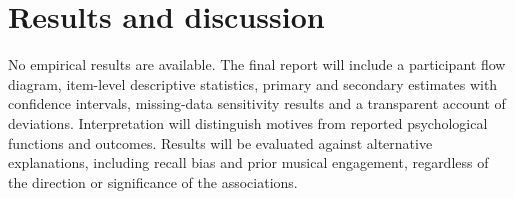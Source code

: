 \documentclass[11pt,a4paper]{article}
\begin{document}
\section{Results and discussion}
No empirical results are available. The final report will include a participant flow diagram, item-level descriptive statistics, primary and secondary estimates with confidence intervals, missing-data sensitivity results and a transparent account of deviations. Interpretation will distinguish motives from reported psychological functions and outcomes. Results will be evaluated against alternative explanations, including recall bias and prior musical engagement, regardless of the direction or significance of the associations.

\printbibliography
\end{document}
